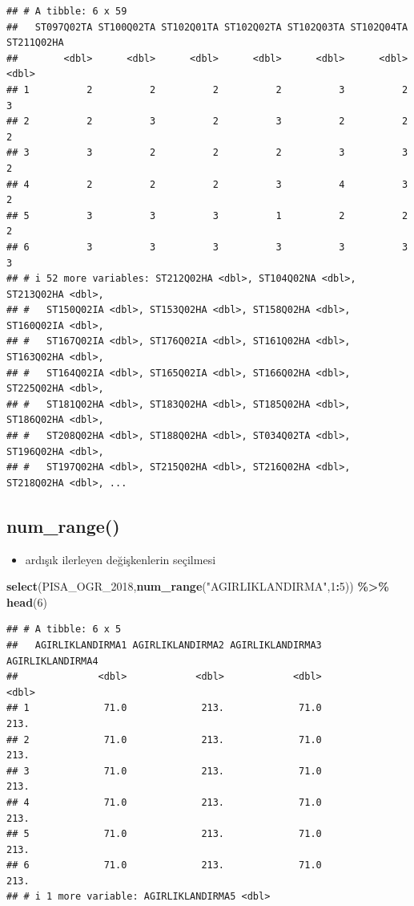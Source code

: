 \documentclass[
  oneside]{book}
\newenvironment{Shaded}{\begin{snugshade}}{\end{snugshade}}
\newcommand{\DecValTok}[1]{\textcolor[rgb]{0.00,0.00,0.81}{#1}}
\newcommand{\FunctionTok}[1]{\textcolor[rgb]{0.13,0.29,0.53}{\textbf{#1}}}
\newcommand{\NormalTok}[1]{#1}
\newcommand{\SpecialCharTok}[1]{\textcolor[rgb]{0.81,0.36,0.00}{\textbf{#1}}}
\newcommand{\StringTok}[1]{\textcolor[rgb]{0.31,0.60,0.02}{#1}}
\providecommand{\tightlist}{%
  \setlength{\itemsep}{0pt}\setlength{\parskip}{0pt}}
\begin{document}
\begin{verbatim}
## # A tibble: 6 x 59
##   ST097Q02TA ST100Q02TA ST102Q01TA ST102Q02TA ST102Q03TA ST102Q04TA ST211Q02HA
##        <dbl>      <dbl>      <dbl>      <dbl>      <dbl>      <dbl>      <dbl>
## 1          2          2          2          2          3          2          3
## 2          2          3          2          3          2          2          2
## 3          3          2          2          2          3          3          2
## 4          2          2          2          3          4          3          2
## 5          3          3          3          1          2          2          2
## 6          3          3          3          3          3          3          3
## # i 52 more variables: ST212Q02HA <dbl>, ST104Q02NA <dbl>, ST213Q02HA <dbl>,
## #   ST150Q02IA <dbl>, ST153Q02HA <dbl>, ST158Q02HA <dbl>, ST160Q02IA <dbl>,
## #   ST167Q02IA <dbl>, ST176Q02IA <dbl>, ST161Q02HA <dbl>, ST163Q02HA <dbl>,
## #   ST164Q02IA <dbl>, ST165Q02IA <dbl>, ST166Q02HA <dbl>, ST225Q02HA <dbl>,
## #   ST181Q02HA <dbl>, ST183Q02HA <dbl>, ST185Q02HA <dbl>, ST186Q02HA <dbl>,
## #   ST208Q02HA <dbl>, ST188Q02HA <dbl>, ST034Q02TA <dbl>, ST196Q02HA <dbl>,
## #   ST197Q02HA <dbl>, ST215Q02HA <dbl>, ST216Q02HA <dbl>, ST218Q02HA <dbl>, ...
\end{verbatim}

\hypertarget{num_range}{%
\subsection{\texorpdfstring{\textbf{num\_range()}}{num\_range()}}\label{num_range}}

\begin{itemize}
\tightlist
\item
  ardışık ilerleyen değişkenlerin seçilmesi
\end{itemize}

\begin{Shaded}
\begin{Highlighting}[]
\FunctionTok{select}\NormalTok{(PISA\_OGR\_2018,}\FunctionTok{num\_range}\NormalTok{(}\StringTok{"AGIRLIKLANDIRMA"}\NormalTok{,}\DecValTok{1}\SpecialCharTok{:}\DecValTok{5}\NormalTok{)) }\SpecialCharTok{\%\textgreater{}\%} \FunctionTok{head}\NormalTok{(}\DecValTok{6}\NormalTok{)}
\end{Highlighting}
\end{Shaded}

\begin{verbatim}
## # A tibble: 6 x 5
##   AGIRLIKLANDIRMA1 AGIRLIKLANDIRMA2 AGIRLIKLANDIRMA3 AGIRLIKLANDIRMA4
##              <dbl>            <dbl>            <dbl>            <dbl>
## 1             71.0             213.             71.0             213.
## 2             71.0             213.             71.0             213.
## 3             71.0             213.             71.0             213.
## 4             71.0             213.             71.0             213.
## 5             71.0             213.             71.0             213.
## 6             71.0             213.             71.0             213.
## # i 1 more variable: AGIRLIKLANDIRMA5 <dbl>
\end{verbatim}
\end{document}
